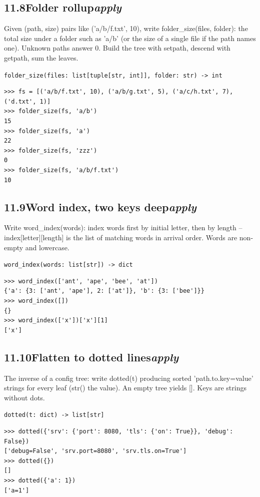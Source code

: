 \documentclass[10pt,letterpaper]{book}
\begin{document}
\subsection*{11.8\quad Folder rollup\hfill\textnormal{\textit{apply}}}
Given (path, size) pairs like ('a/b/f.txt', 10), write folder\_size(files, folder): the total size under a folder such as 'a/b' (or the size of a single file if the path names one). Unknown paths answer 0. Build the tree with setpath, descend with getpath, sum the leaves.

\noindent\texttt{folder\_size(files: list[tuple[str, int]], folder: str) -> int}
\begin{lstlisting}[style=ex]
>>> fs = [('a/b/f.txt', 10), ('a/b/g.txt', 5), ('a/c/h.txt', 7), ('d.txt', 1)]
>>> folder_size(fs, 'a/b')
15
>>> folder_size(fs, 'a')
22
>>> folder_size(fs, 'zzz')
0
>>> folder_size(fs, 'a/b/f.txt')
10
\end{lstlisting}
\subsection*{11.9\quad Word index, two keys deep\hfill\textnormal{\textit{apply}}}
Write word\_index(words): index words first by initial letter, then by length -- index[letter][length] is the list of matching words in arrival order. Words are non-empty and lowercase.

\noindent\texttt{word\_index(words: list[str]) -> dict}
\begin{lstlisting}[style=ex]
>>> word_index(['ant', 'ape', 'bee', 'at'])
{'a': {3: ['ant', 'ape'], 2: ['at']}, 'b': {3: ['bee']}}
>>> word_index([])
{}
>>> word_index(['x'])['x'][1]
['x']
\end{lstlisting}
\subsection*{11.10\quad Flatten to dotted lines\hfill\textnormal{\textit{apply}}}
The inverse of a config tree: write dotted(t) producing sorted 'path.to.key=value' strings for every leaf (str() the value). An empty tree yields []. Keys are strings without dots.

\noindent\texttt{dotted(t: dict) -> list[str]}
\begin{lstlisting}[style=ex]
>>> dotted({'srv': {'port': 8080, 'tls': {'on': True}}, 'debug': False})
['debug=False', 'srv.port=8080', 'srv.tls.on=True']
>>> dotted({})
[]
>>> dotted({'a': 1})
['a=1']
\end{lstlisting}
\end{document}
